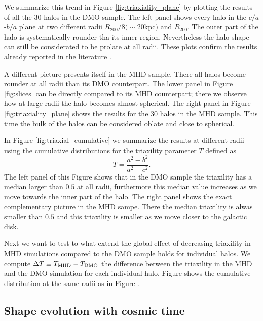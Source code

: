 \documentclass[a4paper,fleqn,usenatbib]{mnras}
\begin{document}
We summarize this trend in Figure \ref{fig:triaxiality_plane} by
plotting the results of all the 30 halos in the DMO sample.
The left panel shows every halo in the $c/a$-$b/a$ plane at
two different radii $R_{200}/8 (\sim 20$kpc$)$ and $R_{200}$. 
The outer part of the halo is systematically rounder tha its inner
region. 
Nevertheless the halo shape can still be considerated to be prolate at
all radii. 
These plots confirm the results already reported in the
literature \citep{Vera-Ciro_et_al._2011}.

A different picture presents itself in the MHD sample.
There all halos become rounder at all radii than its DMO
counterpart.
The lower panel in Figure \ref{fig:slices} can be directly compared to
its MHD counterpart; there we observe how at large radii the halo
becomes almost spherical. 
The right panel in Figure \ref{fig:triaxiality_plane} shows the
results for the 30 halos in the MHD sample.
This time the bulk of the halos can be considered oblate and close to
spherical. 

In Figure \ref{fig:triaxial_cumulative} we summarize the results at
different radii using the cumulative distributions for the 
triaxility parameter $T$ defined as 
\begin{equation}
T=\frac{a^2-b^2}{a^2-c^2}.
\label{eq:triaxiality}
\end{equation}
The left panel of this Figure shows that in the DMO sample the
triaxility has a median larger than $0.5$ at all radii, furthermore
this median value increases as we move towards the inner part of the
halo.
The right panel shows the exact complementary picture in the MHD
sampe.
There the median triaxility is alwas smaller than $0.5$ and this
triaxility is smaller as we move closer to the galactic disk.


Next we want to test to what extend the global effect of decreasing
triaxility in MHD simulations compared to the DMO sample 
holds for individual halos. 
We compute $\Delta T\equiv T_{\rm MHD}-T_{\rm DMO}$ the difference between the
triaxility in the MHD and the DMO simulation for each individual halo. 
Figure \label{fig:delta_triaxial_cumulative} shows the cumulative
distribution at the same radii as in
Figure \label{fig:delta_triaxial_cumulative}. 
    





\subsection{Shape evolution with cosmic time}
\end{document}
